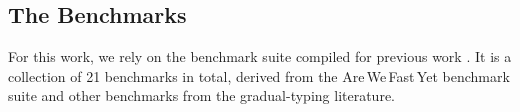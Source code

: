 \documentclass[sigplan,10pt,review,screen]{acmart}\settopmatter{printfolios=true}
\def\AWFY{Are\,We\,Fast\,Yet\xspace}
\begin{document}
\subsection{The Benchmarks}

For this work, we rely on the benchmark suite compiled for previous work
\cite{roberts-and-co-ecoop-2019}.
It is a collection of 21 benchmarks in total,
derived from the \AWFY
benchmark suite \cite{Marr2016} and other benchmarks
from the gradual-typing literature.

%
\end{document}
